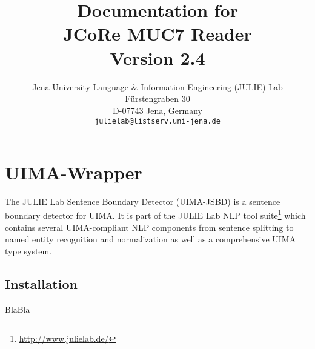 \documentclass[11pt,a4paper,halfparskip]{scrartcl}
\title{\small{Documentation for}\\\huge JCoRe MUC7 Reader\\\vspace{3mm}\small{Version 2.4}}
\author{
  \normalsize  Jena University Language \& Information Engineering (JULIE) Lab\\
  \normalsize F\"urstengraben 30 \\
  \normalsize D-07743 Jena, Germany\\
  {\normalsize \tt julielab@listserv.uni-jena.de} }
\date{}
\begin{document}
\maketitle
\tableofcontents

\section{UIMA-Wrapper}



The JULIE Lab Sentence Boundary Detector (UIMA-JSBD) is a sentence
boundary detector for UIMA.  It is part of the JULIE Lab NLP tool
suite\footnote{\url{http://www.julielab.de/}} which contains several
UIMA-compliant NLP components from sentence splitting to named entity
recognition and normalization as well as a comprehensive UIMA type
system.

\subsection{Installation}

BlaBla
\end{document}
